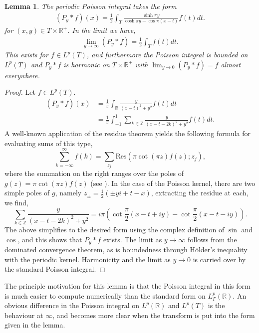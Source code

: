 \documentclass[a4paper, oneside, 12pt]{amsart}
\newtheorem{lemma}{Lemma}
\newcommand{\Z}{\mathbb{Z}}
\newcommand{\R}{\mathbb{R}}
\newcommand{\fr}{\frac}
\begin{document}
\begin{lemma}\label{lemma:1}
The periodic Poisson integral takes the form
    \begin{align*}
        (P_y\ast f)(x) = \frac{1}{2}\int_T \fr{\sinh\pi y}{\cosh\pi y - \cos\pi(x-t)} f(t) dt.
    \end{align*}
	for $(x, y) \in T\times \R^+$. In the limit we have,
    \begin{align*}
        \lim_{y\to\infty} (P_y\ast f) = \frac{1}{2}\int_T f(t)dt.
    \end{align*}
    This exists for $f\in L^p(T)$, and furthermore the Poisson integral is bounded on $L^p(T)$ and $P_y\ast f$ is harmonic on 
    $T\times \R^+$ with $\lim_{y\to 0} (P_y\ast f) = f$ almost everywhere. 
\end{lemma}
\begin{proof}
Let $f\in L^p(T)$.
    \begin{align*}
        (P_y \ast f)(x) &= \frac{1}{\pi} \int_{\R} \frac{y}{(x-t)^2 + y^2}  f(t) dt\\
                   &= \frac{1}{\pi} \int_{-1}^1 \sum_{k\in\Z} \frac{y}{(x-t-2k)^2 + y^2}  f(t) dt.
    \end{align*}
    A well-known application of the residue theorem yields the following formula for evaluating sums of this type,
    $$
        \sum_{k=-\infty}^\infty f(k) = \sum_{z_j}\mathrm{Res}(\pi \cot(\pi z) f(z);z_j),
    $$
    where the summation on the right ranges over the poles of $g(z)=\pi \cot(\pi z) f(z)$ (see \cite{hoffman1999basic}).
    In the case of the Poisson kernel, there are two simple poles of $g$, 
    namely $z_{\pm}=\fr{1}{2}(\pm yi + t - x)$, extracting the residue at each, we find,
    $$
     \sum_{k\in\Z} \frac{y}{(x-t-2k)^2 + y^2} = i \pi 
	    \left(\cot\frac{\pi}{2}(x-t + i y) - \cot\frac{\pi}{2}(x-t - i y)\right).
    $$
    The above simplifies to the desired form using the complex definition of $\sin$ 
    and $\cos$, and this shows that $P_y\ast f$ exists. 
    The limit as $y\to\infty$ follows from the dominated convergence theorem, 
    as is boundedness through H\"{o}lder's inequality with the periodic kernel.
    Harmonicity and the limit as $y\to 0$ is carried over by the standard Poisson integral.
\end{proof}
The principle motivation for this lemma is that the Poisson integral 
in this form is much  easier to compute numerically than the standard form 
on $L_\Gamma^p(\R)$. 
An obvious difference in the Poisson integral on $L^p(\R)$ and $L^p(T)$ is the behaviour at $\infty$,
 and becomes more clear when the transform is put into the form given in the lemma.
 
\end{document}

